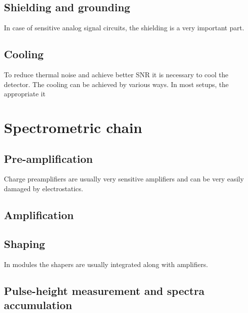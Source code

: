\subsection{Shielding and grounding}

In case of sensitive analog signal circuits, the shielding is a very important part.

\subsection{Cooling}
To reduce thermal noise and achieve better SNR it is necessary to cool the detector. The cooling can be achieved by various ways. In most setups, the appropriate  it 

\section{Spectrometric chain}
\subsection{Pre-amplification}
Charge preamplifiers are usually very sensitive amplifiers and can be very easily damaged by electrostatics.

\subsection{Amplification}

\subsection{Shaping}
In modules the shapers are usually integrated along with amplifiers.

\subsection{Pulse-height measurement and spectra accumulation}




